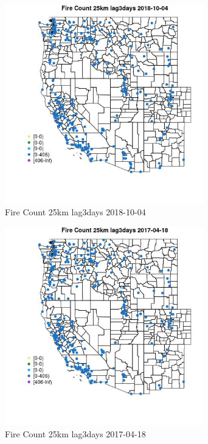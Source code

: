 \begin{figure} 
\centering  
\includegraphics[width=0.77\textwidth]{Code_Outputs/Report_ML_input_PM25_Step4_part_f_de_duplicated_aveswNAs_MapObsFire_Count_25km_lag3days2018-10-04.jpg} 
\caption{\label{fig:Report_ML_input_PM25_Step4_part_f_de_duplicated_aveswNAsMapObsFire_Count_25km_lag3days2018-10-04}Fire Count 25km lag3days 2018-10-04} 
\end{figure} 
 

\begin{figure} 
\centering  
\includegraphics[width=0.77\textwidth]{Code_Outputs/Report_ML_input_PM25_Step4_part_f_de_duplicated_aveswNAs_MapObsFire_Count_25km_lag3days2017-04-18.jpg} 
\caption{\label{fig:Report_ML_input_PM25_Step4_part_f_de_duplicated_aveswNAsMapObsFire_Count_25km_lag3days2017-04-18}Fire Count 25km lag3days 2017-04-18} 
\end{figure} 
 

